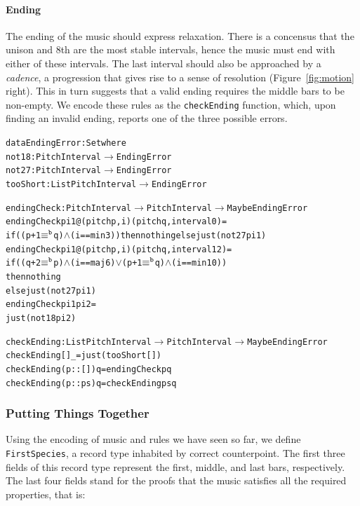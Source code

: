\paragraph{Ending}

The ending of the music should express relaxation.
There is a concensus that the unison and 8th are the most stable
intervals, hence the music must end with either of these intervals.
The last interval should also be approached by a \emph{cadence},
a progression that gives rise to a sense of resolution
(Figure~\ref{fig:motion} right).
This in turn suggests that a valid ending requires the middle bars
to be non-empty.
We encode these rules as the \texttt{checkEnding} function, which,
upon finding an invalid ending, reports one of the three possible
errors.

\begin{alltt}
data EndingError : Set where
  not18    : PitchInterval \(\rightarrow\) EndingError
  not27    : PitchInterval \(\rightarrow\) EndingError
  tooShort : List PitchInterval \(\rightarrow\) EndingError

endingCheck : PitchInterval \(\rightarrow\) PitchInterval \(\rightarrow\) Maybe EndingError
endingCheck pi1@(pitch p , i) (pitch q , interval 0)  = 
  if ((p + 1 \(\equiv\sp{\mathtt{b}}\) q) \(\wedge\) (i == min3)) then nothing else just (not27 pi1)
endingCheck pi1@(pitch p , i) (pitch q , interval 12) =
  if ((q + 2 \(\equiv\sp{\mathtt{b}}\) p) \(\wedge\) (i == maj6) \(\vee\) (p + 1 \(\equiv\sp{\mathtt{b}}\) q) \(\wedge\) (i == min10))
  then nothing
  else just (not27 pi1)
endingCheck pi1               pi2                     =
  just (not18 pi2)

checkEnding : List PitchInterval \(\rightarrow\) PitchInterval \(\rightarrow\) Maybe EndingError
checkEnding []        \_ = just (tooShort [])
checkEnding (p :: []) q = endingCheck p q
checkEnding (p :: ps) q = checkEnding ps q
\end{alltt}

\subsubsection{Putting Things Together}

Using the encoding of music and rules we have seen so far, we define
\texttt{FirstSpecies}, a record type inhabited by correct counterpoint.
The first three fields of this record type represent the first, middle,
and last bars, respectively.
The last four fields stand for the proofs that the music satisfies all
the required properties, that is:

